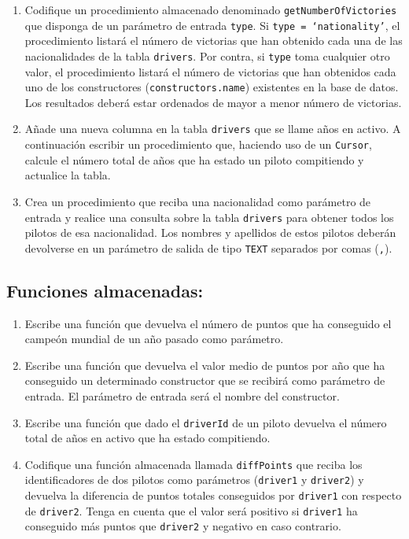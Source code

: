 \documentclass{db-practice}
\begin{document}
\begin{enumerate}
    \item Codifique un procedimiento almacenado denominado \texttt{getNumberOfVictories} que disponga de un parámetro de entrada \texttt{type}. Si \texttt{type = `nationality'}, el procedimiento listará el número de victorias que han obtenido cada una de las nacionalidades de la tabla \texttt{drivers}. Por contra, si \texttt{type} toma cualquier otro valor, el procedimiento listará el número de victorias que han obtenidos cada uno de los constructores (\texttt{constructors.name}) existentes en la base de datos. Los resultados deberá estar ordenados de mayor a menor número de victorias.
    
    \item Añade una nueva columna en la tabla \texttt{drivers} que se llame años en activo. A continuación escribir un procedimiento que, haciendo uso de un \texttt{Cursor}, calcule el número total de años que ha estado un piloto compitiendo y actualice la tabla.

    \item Crea un procedimiento que reciba una nacionalidad como parámetro de entrada y realice una consulta sobre la tabla \texttt{drivers} para obtener todos los pilotos de esa nacionalidad. Los nombres y apellidos de estos pilotos deberán devolverse en un parámetro de salida de tipo \texttt{TEXT} separados por comas (\texttt{,}).
\end{enumerate}

\subsection*{Funciones almacenadas:}

\begin{enumerate}
    \item Escribe una función que devuelva el número de puntos que ha conseguido el campeón mundial de un año pasado como parámetro.
       
    \item Escribe una función que devuelva el valor medio de puntos por año que ha conseguido un determinado constructor que se recibirá como parámetro de entrada. El parámetro de entrada será el nombre del constructor.
            
    \item Escribe una función que dado el \texttt{driverId} de un piloto devuelva el número total de años en activo que ha estado compitiendo.

    \item Codifique una función almacenada llamada \texttt{diffPoints} que reciba los identificadores de dos pilotos como parámetros (\texttt{driver1} y \texttt{driver2}) y devuelva la diferencia de puntos totales conseguidos por \texttt{driver1} con respecto de \texttt{driver2}. Tenga en cuenta que el valor será positivo si \texttt{driver1} ha conseguido más puntos que \texttt{driver2} y negativo en caso contrario.
\end{enumerate}
\end{document}
